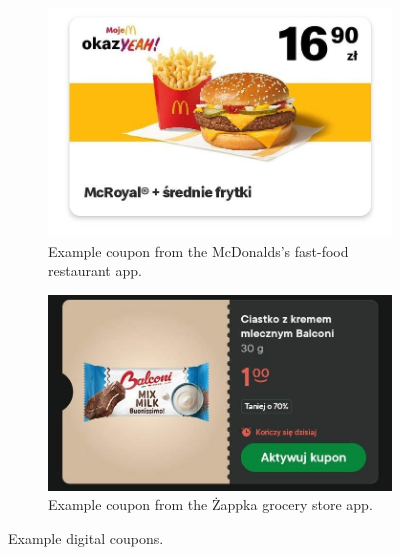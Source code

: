 \documentclass[licencjacka,en]{pracamgr}
\begin{document}
\begin{figure}[htbp]
    \centering
    \begin{subfigure}[b]{0.45\textwidth}
        \centering
        \includegraphics[width=\textwidth]{bachelor_images/coupon1.jpg}
        \caption{Example coupon from the McDonalds's fast-food restaurant app.}
        \label{fig:coupon1}
    \end{subfigure}
    \hfill
    \begin{subfigure}[b]{0.45\textwidth}
        \centering
        \includegraphics[width=\textwidth]{bachelor_images/coupon2.jpg}
        \caption{Example coupon from the Żappka grocery store app.}
        \label{fig:coupon2}
    \end{subfigure}
    \caption{Example digital coupons.}
    \label{fig:example_coupons}
\end{figure}
\end{document}
